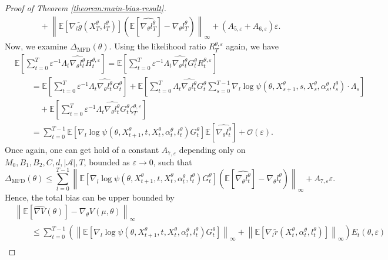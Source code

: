 \documentclass[11pt]{article}
\numberwithin{equation}{section}
\theoremstyle{definition}
\theoremstyle{remark}
\def\eps{\varepsilon}
\def\cA{\mathcal{A}}
\begin{document}
\begin{proof}[Proof of Theorem \ref{theorem:main-bias-result}]
\[\begin{aligned}
    & \quad +\left\|\mathbb E \left[ \nabla_l \tilde g(X_T^\theta, l_T^\theta) \right] \left(\mathbb E \left[ \widehat{\nabla_\theta l^\theta_T} \right] - \nabla_\theta l_T^\theta\right)\right\|_\infty + (A_{5,\eps} + A_{6,\eps}) \eps.  
\end{aligned}
\]
Now, we examine $\Delta_{\mathrm{MFD}}(\theta)$.
Using the likelihood ratio $R_T^{\theta, \eps}$ again, we have
\[
\begin{aligned}
&\mathbb E \left[ \sum_{t=0}^T \eps^{-1} \Lambda_t \widehat{\nabla_\theta l_t^\theta} H_t^{\theta, \eps} \right] = \mathbb E \left[ \sum_{t=0}^T \eps^{-1} \Lambda_t \widehat{\nabla_\theta l_t^\theta} G_t^\theta R_t^{\theta, \eps} \right] \\
&\qquad = \mathbb E \left[ \sum_{t=0}^T \eps^{-1}\Lambda_t \widehat{\nabla_\theta l_t^\theta} G_t^\theta \right] + \mathbb E \left[ \sum_{t=0}^T \Lambda_t \widehat{\nabla_\theta l_t^\theta} G_t^\theta \sum_{s=0}^{T-1} \nabla_l \log \psi(\theta, X_{s+1}^\theta, s,X_s^\theta, \alpha_s^\theta, l_s^\theta) \cdot \Lambda_s \right] \\
& \qquad \quad + \mathbb E \left[ \sum_{t=0}^T \eps^{-1} \Lambda_t \widehat{\nabla_\theta l_t^\theta} G_t^\theta \zeta_T^{\theta, \eps} \right] \\
&\qquad = \sum_{t=0}^{T - 1}  \mathbb E \left[ \nabla_l \log \psi(\theta, X_{t+1}^\theta, t,X_t^\theta, \alpha_t^\theta, l_t^\theta) G_t^\theta \right] \mathbb E \left[\widehat{\nabla_\theta l_t^\theta} \right] + \mathcal O (\eps).  
\end{aligned}
\]
Once again, one can get hold of a constant $A_{7, \eps}$ depending only on $M_0, B_1, B_2, C, d, | \cA |, T$, bounded as $\eps \to 0$, such that
\[
\Delta_{\mathrm{MFD}}(\theta) \leq \sum_{t=0}^{T - 1}  \left\|\mathbb E \left[ \nabla_l \log \psi(\theta, X_{t+1}^\theta,t, X_t^\theta, \alpha_t^\theta, l_t^\theta) G_t^\theta \right] \left(\mathbb E \left[\widehat{\nabla_\theta l_t^\theta} \right] - \nabla_\theta l_t^\theta\right) \right\|_\infty + A_{7,\eps} \eps.
\]
Hence, the total bias can be upper bounded by
\[
\begin{aligned}
& \left\| \mathbb E \left[\widehat{\nabla V}(\theta) \right] - \nabla_\theta V (\mu, \theta)\right\|_\infty \\
& \qquad \leq \sum_{t=0}^{T-1} \left(\left\| \mathbb E \left[ \nabla_l \log \psi(\theta, X_{t+1}^\theta, t,X_t^\theta, \alpha_t^\theta, l_t^\theta) G_t^\theta \right] \right\|_\infty + \left\|\mathbb E \left[\nabla_l \tilde r(X_t^\theta, \alpha_t^\theta, l_t^\theta) \right] \right\|_\infty \right) E_t(\theta, \eps) \\

\end{aligned}\]
\end{proof}
\end{document}
